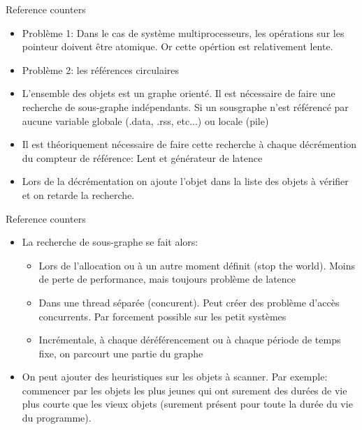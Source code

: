 \begin{frame}[fragile=singleslide]{Reference counters}
  \begin{itemize}
  \item  Problème 1:  Dans  le cas  de  système multiprocesseurs,  les
    opérations  sur  les pointeur  doivent  être  atomique.  Or  cette
    opértion est relativement lente.
  \item Problème 2: les références circulaires
  \item L'ensemble des objets est un graphe orienté. Il est nécessaire
    de  faire  une  recherche  de  sous-graphe  indépendants.   Si  un
    sousgraphe  n'est référencé  par aucune  variable  globale (.data,
    .rss, etc...) ou locale (pile)
  \item  Il est théoriquement  nécessaire de  faire cette  recherche à
    chaque décrémention  du compteur de référence:  Lent et générateur
    de latence
  \item Lors de la décrémentation  on ajoute l'objet dans la liste des
    objets à vérifier et  on retarde la recherche.
  \end{itemize}
\end{frame}

\begin{frame}[fragile=singleslide]{Reference counters}
  \begin{itemize}
  \item La recherche de sous-graphe se fait alors:
    \begin{itemize}
    \item Lors de l'allocation ou  à un autre moment définit (stop the
      world). Moins de perte de performance, mais toujours problème de
      latence
    \item  Dans  une  thread  séparée  (concurent).   Peut  créer  des
      problème  d'accès concurrents.  Par  forcement possible  sur les
      petit systèmes
    \item Incrémentale,  à chaque déréférencement ou  à chaque période
      de temps fixe, on parcourt une partie du graphe
    \end{itemize}
  \item On peut ajouter des heuristiques sur les objets à scanner. Par
    exemple: commencer par les objets les plus jeunes qui ont surement
    des  durées de  vie plus  courte  que les  vieux objets  (surement
    présent pour toute la durée du vie du programme).
  \end{itemize}
\end{frame}


